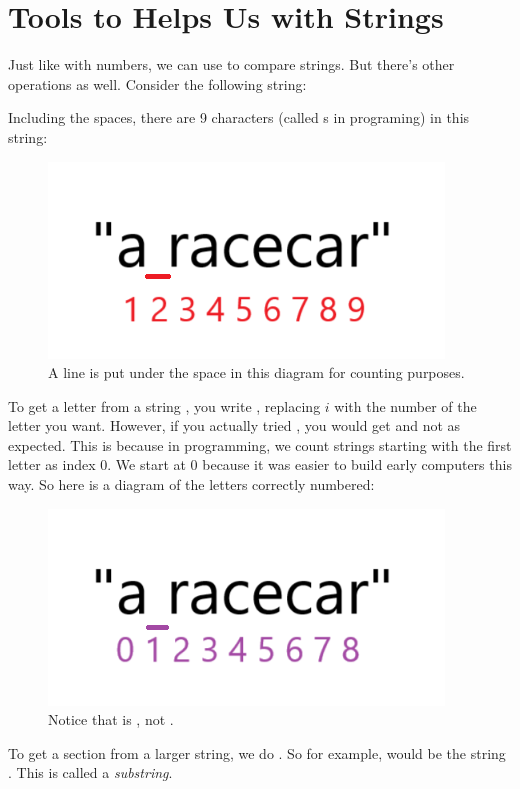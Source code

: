\documentclass[12pt]{scrartcl}
\begin{document}
\section{Tools to Helps Us with Strings}
Just like with numbers, we can use  to compare strings. But there's other operations as well. Consider the following string:
\begin{center}
\end{center}
Including the spaces, there are 9 characters (called s in programing) in this string:
\begin{figure}[H]
    \centering 
    \includegraphics[scale=0.5]{A racecar Counted.png}
    \caption*{A line is put under the space in this diagram for counting purposes.}
\end{figure}
To get a letter from a string , you write , replacing $i$ with the number of the letter you want. However, if you actually tried , you would get  and not  as expected. This is because in programming, we count strings starting with the first letter as index 0. We start at 0 because it was easier to build early computers this way. So here is a diagram of the letters correctly numbered:
\begin{figure}[H]
    \centering 
    \includegraphics[scale=0.5]{A racecar Indexed.png}
    \caption*{Notice that  is , not .}
\end{figure}
To get a section from a larger string, we do . So for example,  would be the string . This is called a \textit{substring}.
\end{document}
